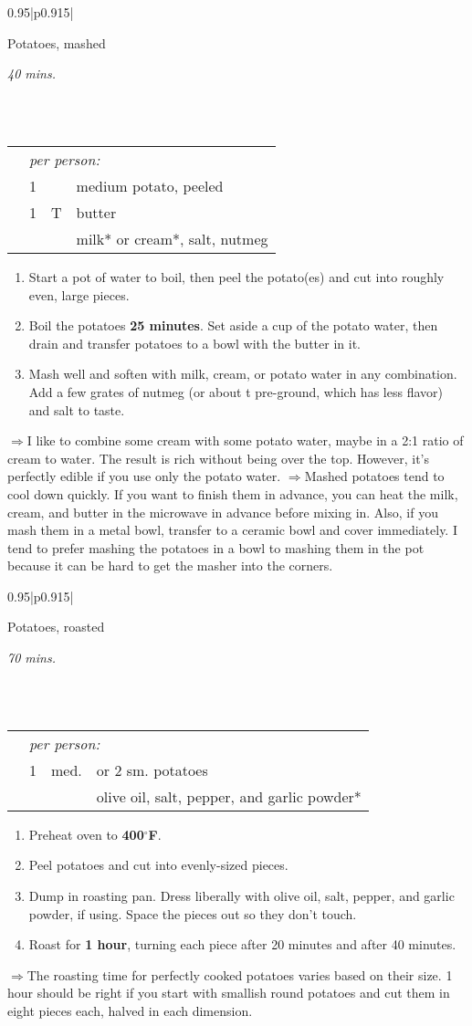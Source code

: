 \documentclass[8pt]{report}
\newcommand{\ingredmargin}{0.25cm}
\newcommand{\F}{$^\circ$F}
\newcommand{\fr}[2]{\nicefrac{#1}{#2}}
\newenvironment{recipe}[3]
  {\bigskip \bigskip 
\begin{tabular*}{0.95\textwidth}{|p{0.915\textwidth}|} \hline \vspace{0.25mm}
\begin{minipage}{0.7\textwidth}	\begin{flushleft} {\Large \textsf{#1}} \end{flushleft} \end{minipage}
\begin{minipage}{0.2\textwidth} \begin{flushright} \emph{#2} \end{flushright} \end{minipage} \\ \\ \hline
\begin{ingreds}{#3} \addcontentsline{toc}{section}{#1} \phantomsection \label{rec:#1}} 
  {\\ \hline \end{tabular*} \noindent}
\newenvironment{ingreds}[1]
  {\begin{tabular}{lrlp{0.6\textwidth}} \hspace{\ingredmargin} & \multicolumn{3}{l}{\it #1:} \\}
  {\end{tabular} \medskip}
\newcommand{\ingredsdone}{\end{ingreds}\begin{enumerate}}
\newcommand{\stepsdone}{\end{enumerate} \medskip}
\newcommand{\ingredient}[3]{\hspace{\ingredmargin} & #1 & #2 & #3 \\}
\newcommand{\tip}{$\Rightarrow$}
\begin{document}
\begin{recipe}{Potatoes, mashed}{40 mins.}{per person}
\index{potatoes!mashed}
\index{vegetables!potatoes}
\ingredient{1}{}{medium potato, peeled}
\ingredient{1}{T}{butter}
\ingredient{}{}{milk* or cream*, salt, nutmeg}
\ingredsdone
\item Start a pot of water to boil, then peel the potato(es) and cut into roughly even, large pieces.
\item Boil the potatoes {\bf 25 minutes}.  Set aside a cup of the potato water, then drain and transfer potatoes to a bowl with the butter in it.
\item Mash well and soften with milk, cream, or potato water in any combination.  Add a few grates of nutmeg (or about \fr13 t pre-ground, which has less flavor) and salt to taste.
\stepsdone
\noindent \tip I like to combine some cream with some potato water, maybe in a 2:1 ratio of cream to water.  The result is rich without being over the top.  However, it's perfectly edible if you use only the potato water.  
\noindent \tip Mashed potatoes tend to cool down quickly.  If you want to finish them in advance, you can heat the milk, cream, and butter in the microwave in advance before mixing in.  Also, if you mash them in a metal bowl, transfer to a ceramic bowl and cover immediately.  I tend to prefer mashing the potatoes in a bowl to mashing them in the pot because it can be hard to get the masher into the corners.
\end{recipe}

\begin{recipe}{Potatoes, roasted}{70 mins.}{per person}
\index{potatoes!roasted}
\index{vegetables!potatoes}
\ingredient{1}{med.}{or 2 sm. potatoes}
\ingredient{}{}{olive oil, salt, pepper, and garlic powder*}
\ingredsdone
\item Preheat oven to {\bf 400\F}.
\item Peel potatoes and cut into evenly-sized pieces.  
\item Dump in roasting pan.  Dress liberally with olive oil, salt, pepper, and garlic powder, if using.  Space the pieces out so they don't touch.
\item Roast for {\bf 1 hour}, turning each piece after 20 minutes and after 40 minutes.
\stepsdone
\noindent \tip The roasting time for perfectly cooked potatoes varies based on their size. 1 hour should be right if you start with smallish round potatoes and cut them in eight pieces each, halved in each dimension.
\end{recipe}
\end{document}
